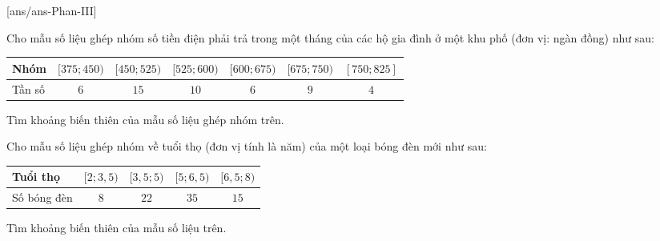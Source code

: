 \caukq
{}[ans/ans\currfilebase-Phan-III]

\begin{ex}%
 Cho mẫu số liệu ghép nhóm số tiền điện phải trả trong một tháng của các hộ gia đình ở một khu phố (đơn vị: ngàn đồng) như sau:
\begin{center}
 \begin{tabular}{|l|c|c|c|c|c|c|}
 \hline
 Nhóm & $[375; 450)$ & $[450; 525)$ & $[525; 600)$ & $[600; 675)$ & $[675; 750)$ & $[750; 825]$\\
 \hline
 Tần số & $6$ & $15$ & $10$ & $6$ & $9$ & $4$ \\
 \hline
 \end{tabular}
\end{center}
 Tìm khoảng biến thiên của mẫu số liệu ghép nhóm trên.
 
\end{ex}

\begin{ex}%
 Cho mẫu số liệu ghép nhóm về tuổi thọ (đơn vị tính là năm) của một loại bóng đèn mới như sau:
 \begin{center}
 \begin{tabular}{|l|c|c|c|c|}
 \hline
 Tuổi thọ & $[2; 3{,}5)$ & $[3{,}5; 5)$ & $[5; 6{,}5)$ & $[6{,}5; 8)$\\
 \hline
 Số bóng đèn & $8$ & $22$ & $35$ & $15$ \\
 \hline
 \end{tabular}
 \end{center}
 Tìm khoảng biến thiên của mẫu số liệu trên.
 
\end{ex}

